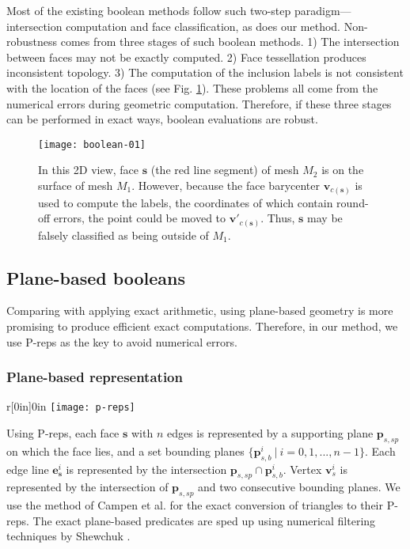 Most of the existing boolean methods follow such two-step paradigm---intersection computation and face classification, as does our method. Non-robustness comes from three stages of such boolean methods. 1) The intersection between faces may not be exactly computed. 2) Face tessellation produces inconsistent topology. 3) The computation of the inclusion labels is not consistent with the location of the faces (see Fig. \ref{fig:falseclass}). These problems all come from the numerical errors during geometric computation. Therefore, if these three stages can be performed in exact ways, boolean evaluations are robust.

\begin{figure}[t]
\centering
\texttt{[image: boolean-01]}
\caption{In this 2D view, face $\bm{s}$ (the red line segment) of mesh $M_2$ is on the surface of mesh $M_1$. However, because the face barycenter $\bm{v}_{c(\bm{s})}$ is used to compute the labels, the coordinates of which contain round-off errors, the point could be moved to $\bm{v'}_{c(\bm{s})}$. Thus, $\bm{s}$ may be falsely classified as being outside of $M_1$.}
\label{fig:falseclass}
\end{figure}


\subsection{Plane-based booleans}
Comparing with applying exact arithmetic, using plane-based geometry \cite{campen2010exact} is more promising to produce efficient exact computations. Therefore, in our method, we use P-reps as the key to avoid numerical errors.

\label{sec:substrates}
\subsubsection{Plane-based representation}


\begin{wrapfigure}{r}[0in]{0in}
\texttt{[image: p-reps]}
\end{wrapfigure}

Using P-reps, each face $\bm{s}$ with $n$ edges is represented by a supporting plane $\bm{p}_{s,sp}$ on which the face lies, and a set bounding planes $\{\bm{p}_{s,b}^i \ \vert\  i = 0, 1,...,n-1\}$. Each edge line $\bm{e}_{\bm{s}}^i$ is represented by the intersection $\bm{p}_{s,sp} \cap \bm{p}_{s,b}^i$.
Vertex $\bm{v}_s^i$ is represented by the intersection of $\bm{p}_{s,sp}$ and two consecutive bounding planes. We use the method of Campen et al. \cite{campen2010exact} for the exact conversion of triangles to their P-reps. The exact plane-based predicates are sped up using numerical filtering techniques by Shewchuk \cite{shewchuk1997adaptive}.


